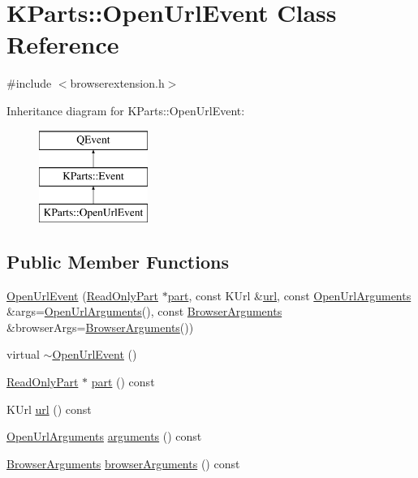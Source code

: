\hypertarget{classKParts_1_1OpenUrlEvent}{\section{K\+Parts\+:\+:Open\+Url\+Event Class Reference}
\label{classKParts_1_1OpenUrlEvent}
}


{\ttfamily \#include $<$browserextension.\+h$>$}

Inheritance diagram for K\+Parts\+:\+:Open\+Url\+Event\+:\begin{figure}[H]
\begin{center}
\leavevmode
\includegraphics[height=3.000000cm]{classKParts_1_1OpenUrlEvent}
\end{center}
\end{figure}
\subsection*{Public Member Functions}
\begin{DoxyCompactItemize}
\item 
\hyperlink{classKParts_1_1OpenUrlEvent_af98b6f595f6aa62dca8d72ff54138ec9}{Open\+Url\+Event} (\hyperlink{classKParts_1_1ReadOnlyPart}{Read\+Only\+Part} $\ast$\hyperlink{classKParts_1_1OpenUrlEvent_a2c23bcde7fee2966c25dbd7d961b151b}{part}, const K\+Url \&\hyperlink{classKParts_1_1OpenUrlEvent_a910c8c089b7c863e49cd83ddf4b8f003}{url}, const \hyperlink{classKParts_1_1OpenUrlArguments}{Open\+Url\+Arguments} \&args=\hyperlink{classKParts_1_1OpenUrlArguments}{Open\+Url\+Arguments}(), const \hyperlink{structKParts_1_1BrowserArguments}{Browser\+Arguments} \&browser\+Args=\hyperlink{structKParts_1_1BrowserArguments}{Browser\+Arguments}())
\item 
virtual \hyperlink{classKParts_1_1OpenUrlEvent_aceb6c7fd12ae21889f779d7a074e02ca}{$\sim$\+Open\+Url\+Event} ()
\item 
\hyperlink{classKParts_1_1ReadOnlyPart}{Read\+Only\+Part} $\ast$ \hyperlink{classKParts_1_1OpenUrlEvent_a2c23bcde7fee2966c25dbd7d961b151b}{part} () const 
\item 
K\+Url \hyperlink{classKParts_1_1OpenUrlEvent_a910c8c089b7c863e49cd83ddf4b8f003}{url} () const 
\item 
\hyperlink{classKParts_1_1OpenUrlArguments}{Open\+Url\+Arguments} \hyperlink{classKParts_1_1OpenUrlEvent_a8a365e2cb9c4be571aa5c0c383280fa0}{arguments} () const 
\item 
\hyperlink{structKParts_1_1BrowserArguments}{Browser\+Arguments} \hyperlink{classKParts_1_1OpenUrlEvent_a410497aaab6fbe7c2ff0ab9ca86f32ab}{browser\+Arguments} () const 
\end{DoxyCompactItemize}
